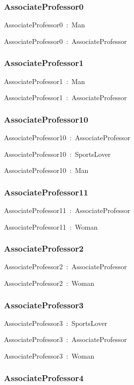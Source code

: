 \documentclass{article}
\begin{document}
\subsubsection*{AssociateProfessor0}

AssociateProfessor0~:~Man

AssociateProfessor0~:~AssociateProfessor

\subsubsection*{AssociateProfessor1}

AssociateProfessor1~:~Man

AssociateProfessor1~:~AssociateProfessor

\subsubsection*{AssociateProfessor10}

AssociateProfessor10~:~AssociateProfessor

AssociateProfessor10~:~SportsLover

AssociateProfessor10~:~Man

\subsubsection*{AssociateProfessor11}

AssociateProfessor11~:~AssociateProfessor

AssociateProfessor11~:~Woman

\subsubsection*{AssociateProfessor2}

AssociateProfessor2~:~AssociateProfessor

AssociateProfessor2~:~Woman

\subsubsection*{AssociateProfessor3}

AssociateProfessor3~:~SportsLover

AssociateProfessor3~:~AssociateProfessor

AssociateProfessor3~:~Woman

\subsubsection*{AssociateProfessor4}
\end{document}

